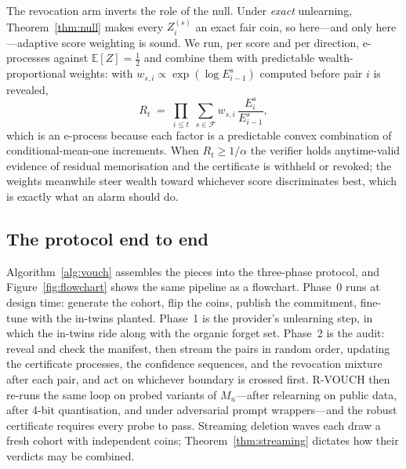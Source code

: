 \documentclass[pdflatex,sn-mathphys-num]{sn-jnl}
\theoremstyle{thmstyleone}
\theoremstyle{thmstyletwo}
\theoremstyle{thmstylethree}
\newcommand{\F}{\mathcal{F}}
\newcommand{\Efrak}{\mathbb{E}}
\begin{document}
The revocation arm inverts the role of the null. Under \emph{exact} unlearning,
Theorem~\ref{thm:null} makes every $Z_i^{(s)}$ an exact fair coin, so here---and only
here---adaptive score weighting is sound. We run, per score and per direction,
e-processes against $\Efrak[Z] = \tfrac12$ and combine them with predictable
wealth-proportional weights: with $w_{s,i} \propto \exp(\log E^{s}_{i-1})$ computed
before pair $i$ is revealed,
\begin{equation}\label{eq:revmix}
R_t \;=\; \prod_{i\le t}\;\sum_{s\in\F} w_{s,i}\,
\frac{E^{s}_{i}}{E^{s}_{i-1}},
\end{equation}
which is an e-process because each factor is a predictable convex combination of
conditional-mean-one increments. When $R_t \ge 1/\alpha$ the verifier holds
anytime-valid evidence of residual memorisation and the certificate is withheld or
revoked; the weights meanwhile steer wealth toward whichever score discriminates best,
which is exactly what an alarm should do.

\subsection{The protocol end to end}\label{sec:protocol}

Algorithm~\ref{alg:vouch} assembles the pieces into the three-phase protocol, and
Figure~\ref{fig:flowchart} shows the same pipeline as a flowchart. Phase~0 runs at
design time: generate the cohort, flip the coins, publish the commitment, fine-tune
with the in-twins planted. Phase~1 is the provider's unlearning step, in which the
in-twins ride along with the organic forget set. Phase~2 is the audit: reveal and check
the manifest, then stream the pairs in random order, updating the certificate
processes, the confidence sequences, and the revocation mixture after each pair, and
act on whichever boundary is crossed first. R-VOUCH then re-runs the same loop on
probed variants of $M_u$---after relearning on public data, after 4-bit quantisation,
and under adversarial prompt wrappers---and the robust certificate requires every probe
to pass. Streaming deletion waves each draw a fresh cohort with independent coins;
Theorem~\ref{thm:streaming} dictates how their verdicts may be combined.
\end{document}
